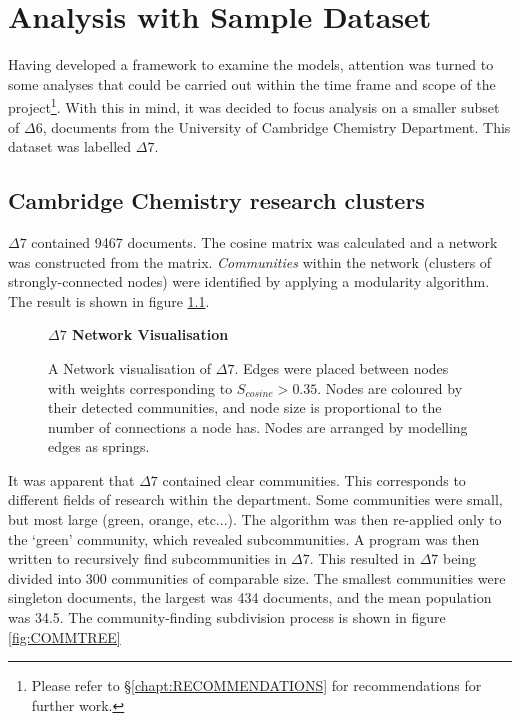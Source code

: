 \chapter{Analysis with Sample Dataset}
\label{chapt:ANALYSIS}
Having developed a framework to examine the models, attention was turned to some analyses that could be carried out within the time frame and scope of the project\footnote{Please refer to  \S\ref{chapt:RECOMMENDATIONS} for recommendations for further work.}. With this in mind, it was decided to focus analysis on a smaller subset of $\Delta6$, documents from the University of Cambridge Chemistry Department. This dataset was labelled $\Delta7$.
\section{Cambridge Chemistry research clusters}
\label{sec:RESEARCHCLUSTERS}
$\Delta7$ contained 9467 documents. The cosine matrix was calculated and a network was constructed from the matrix. \emph{Communities} within the network (clusters of strongly-connected nodes) were identified by applying a modularity algorithm\cite{modularity1}\cite{modularity2}. The result is shown in figure \ref{fig:CAMCOMMUNITIES}.
\begin{center}
\begin{figure}[H]
  \centering
  \textbf{$\Delta7$ Network Visualisation}\par\medskip
    \caption[Network Visualisation of University of Cambridge Chemistry Department Documents]{A Network visualisation of  $\Delta7$. Edges were placed between nodes with weights corresponding to $S_{cosine} > 0.35$. Nodes are coloured by their detected communities, and node size is proportional to the number of connections a node has. Nodes are arranged by modelling edges as springs.}
    \label{fig:CAMCOMMUNITIES}
\end{figure} 
\end{center}
It was apparent that $\Delta7$ contained clear communities. This corresponds to different fields of research within the department. Some communities were small, but most large (green, orange, etc...). The algorithm was then re-applied only to the `green' community, which revealed subcommunities. A program was then written to recursively find subcommunities in $\Delta7$. This resulted in $\Delta7$ being divided into 300 communities of comparable size. The smallest communities were singleton documents, the largest was 434 documents, and the mean population was 34.5. The community-finding subdivision process is shown in figure \ref{fig:COMMTREE}
